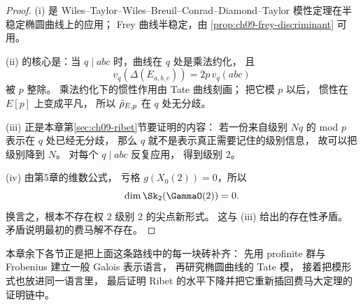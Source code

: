 \begin{proof}
(i) 是 Wiles--Taylor--Wiles--Breuil--Conrad--Diamond--Taylor 模性定理在半稳定椭圆曲线上的应用；
Frey 曲线半稳定，由 \cref{prop:ch09-frey-discriminant} 可用。

(ii) 的核心是：当 $q\mid abc$ 时，曲线在 $q$ 处是乘法约化，
且
\[
  v_q(\Delta(E_{a,b,c}))=2p\,v_q(abc)
\]
被 $p$ 整除。
乘法约化下的惯性作用由 Tate 曲线刻画；
把它模 $p$ 以后，
惯性在 $E[p]$ 上变成平凡，
所以 $\bar{\rho}_{E,p}$ 在 $q$ 处无分歧。

(iii) 正是本章第\ref{sec:ch09-ribet}节要证明的内容：
若一份来自级别 $Nq$ 的 mod $p$ 表示在 $q$ 处已经无分歧，
那么 $q$ 就不是表示真正需要记住的级别信息，
故可以把级别降到 $N$。
对每个 $q\mid abc$ 反复应用，
得到级别 $2$。

(iv) 由第5章的维数公式，
亏格 $g(X_0(2))=0$，所以
\[
  \dim \Sk_2(\GammaO(2))=0.
\]
换言之，根本不存在权 $2$ 级别 $2$ 的尖点新形式。
这与 (iii) 给出的存在性矛盾。
矛盾说明最初的费马解不存在。
\end{proof}

本章余下各节正是把上面这条路线中的每一块砖补齐：
先用 profinite 群与 Frobenius 建立一般 Galois 表示语言，
再研究椭圆曲线的 Tate 模，
接着把模形式也放进同一语言里，
最后证明 Ribet 的水平下降并把它重新插回费马大定理的证明链中。
